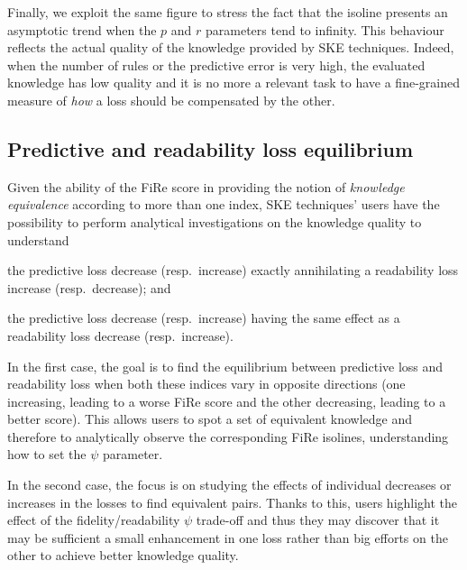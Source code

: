 \documentclass{article}
\newcommand{\fire}{FiRe}
\newenvironment{inlinelist}{\begin{enumerate*}[label=\emph{(\roman{*})}]}{\end{enumerate*}}
\begin{document}
Finally, we exploit the same figure to stress the fact that the isoline presents an asymptotic trend when the $p$ and $r$ parameters tend to infinity.
%
This behaviour reflects the actual quality of the knowledge provided by SKE techniques.
%
Indeed, when the number of rules or the predictive error is very high, the evaluated knowledge has low quality and it is no more a relevant task to have a fine-grained measure of \emph{how} a loss should be compensated by the other.

\subsection{Predictive and readability loss equilibrium}\label{ssec:balance}

Given the ability of the \fire{} score in providing the notion of \emph{knowledge equivalence} according to more than one index, SKE techniques' users have the possibility to perform analytical investigations on the knowledge quality to understand
%
\begin{inlinelist}
	\item the predictive loss decrease (resp.\ increase) exactly annihilating a readability loss increase (resp.\ decrease); and
	\item the predictive loss decrease (resp.\ increase) having the same effect as a readability loss decrease (resp.\ increase).
\end{inlinelist}

In the first case, the goal is to find the equilibrium between predictive loss and readability loss when both these indices vary in opposite directions (one increasing, leading to a worse \fire{} score and the other decreasing, leading to a better score).
%
This allows users to spot a set of equivalent knowledge and therefore to analytically observe the corresponding \fire{} isolines, understanding how to set the $\psi$ parameter.

In the second case, the focus is on studying the effects of individual decreases or increases in the losses to find equivalent pairs.
%
Thanks to this, users highlight the effect of the fidelity/readability $\psi$ trade-off and thus they may discover that it may be sufficient a small enhancement in one loss rather than big efforts on the other to achieve better knowledge quality.
\end{document}
